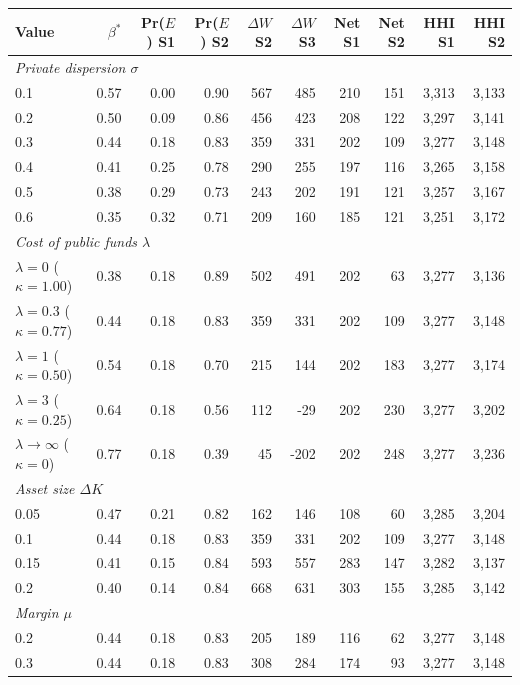 \begin{tabular}{lrrrrrrrrr}
\toprule
Value & $\beta^*$ & Pr($E$) S1 & Pr($E$) S2 & $\Delta W$ S2 & $\Delta W$ S3 & Net S1 & Net S2 & HHI S1 & HHI S2 \\
\midrule
\multicolumn{10}{l}{\textit{Private dispersion $\sigma$}} \\
0.1 & 0.57 & 0.00 & 0.90 & 567 & 485 & 210 & 151 & 3,313 & 3,133 \\
0.2 & 0.50 & 0.09 & 0.86 & 456 & 423 & 208 & 122 & 3,297 & 3,141 \\
0.3 & 0.44 & 0.18 & 0.83 & 359 & 331 & 202 & 109 & 3,277 & 3,148 \\
0.4 & 0.41 & 0.25 & 0.78 & 290 & 255 & 197 & 116 & 3,265 & 3,158 \\
0.5 & 0.38 & 0.29 & 0.73 & 243 & 202 & 191 & 121 & 3,257 & 3,167 \\
0.6 & 0.35 & 0.32 & 0.71 & 209 & 160 & 185 & 121 & 3,251 & 3,172 \\
\midrule
\multicolumn{10}{l}{\textit{Cost of public funds $\lambda$}} \\
$\lambda{=}0$ ($\kappa{=}1.00$) & 0.38 & 0.18 & 0.89 & 502 & 491 & 202 & 63 & 3,277 & 3,136 \\
$\lambda{=}0.3$ ($\kappa{=}0.77$) & 0.44 & 0.18 & 0.83 & 359 & 331 & 202 & 109 & 3,277 & 3,148 \\
$\lambda{=}1$ ($\kappa{=}0.50$) & 0.54 & 0.18 & 0.70 & 215 & 144 & 202 & 183 & 3,277 & 3,174 \\
$\lambda{=}3$ ($\kappa{=}0.25$) & 0.64 & 0.18 & 0.56 & 112 & -29 & 202 & 230 & 3,277 & 3,202 \\
$\lambda\to\infty$ ($\kappa{=}0$) & 0.77 & 0.18 & 0.39 & 45 & -202 & 202 & 248 & 3,277 & 3,236 \\
\midrule
\multicolumn{10}{l}{\textit{Asset size $\Delta K$}} \\
0.05 & 0.47 & 0.21 & 0.82 & 162 & 146 & 108 & 60 & 3,285 & 3,204 \\
0.1 & 0.44 & 0.18 & 0.83 & 359 & 331 & 202 & 109 & 3,277 & 3,148 \\
0.15 & 0.41 & 0.15 & 0.84 & 593 & 557 & 283 & 147 & 3,282 & 3,137 \\
0.2 & 0.40 & 0.14 & 0.84 & 668 & 631 & 303 & 155 & 3,285 & 3,142 \\
\midrule
\multicolumn{10}{l}{\textit{Margin $\mu$}} \\
0.2 & 0.44 & 0.18 & 0.83 & 205 & 189 & 116 & 62 & 3,277 & 3,148 \\
0.3 & 0.44 & 0.18 & 0.83 & 308 & 284 & 174 & 93 & 3,277 & 3,148 \\

\end{tabular}
